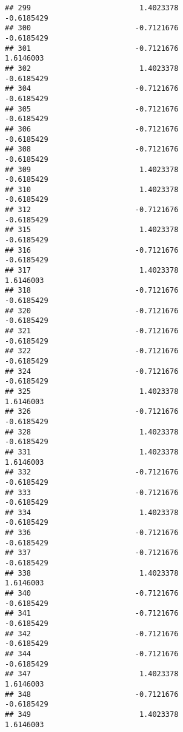 \documentclass[
]{article}
\begin{document}
\begin{verbatim}
## 299                         1.4023378                       -0.6185429
## 300                        -0.7121676                       -0.6185429
## 301                        -0.7121676                        1.6146003
## 302                         1.4023378                       -0.6185429
## 304                        -0.7121676                       -0.6185429
## 305                        -0.7121676                       -0.6185429
## 306                        -0.7121676                       -0.6185429
## 308                        -0.7121676                       -0.6185429
## 309                         1.4023378                       -0.6185429
## 310                         1.4023378                       -0.6185429
## 312                        -0.7121676                       -0.6185429
## 315                         1.4023378                       -0.6185429
## 316                        -0.7121676                       -0.6185429
## 317                         1.4023378                        1.6146003
## 318                        -0.7121676                       -0.6185429
## 320                        -0.7121676                       -0.6185429
## 321                        -0.7121676                       -0.6185429
## 322                        -0.7121676                       -0.6185429
## 324                        -0.7121676                       -0.6185429
## 325                         1.4023378                        1.6146003
## 326                        -0.7121676                       -0.6185429
## 328                         1.4023378                       -0.6185429
## 331                         1.4023378                        1.6146003
## 332                        -0.7121676                       -0.6185429
## 333                        -0.7121676                       -0.6185429
## 334                         1.4023378                       -0.6185429
## 336                        -0.7121676                       -0.6185429
## 337                        -0.7121676                       -0.6185429
## 338                         1.4023378                        1.6146003
## 340                        -0.7121676                       -0.6185429
## 341                        -0.7121676                       -0.6185429
## 342                        -0.7121676                       -0.6185429
## 344                        -0.7121676                       -0.6185429
## 347                         1.4023378                        1.6146003
## 348                        -0.7121676                       -0.6185429
## 349                         1.4023378                        1.6146003

\end{verbatim}
\end{document}
